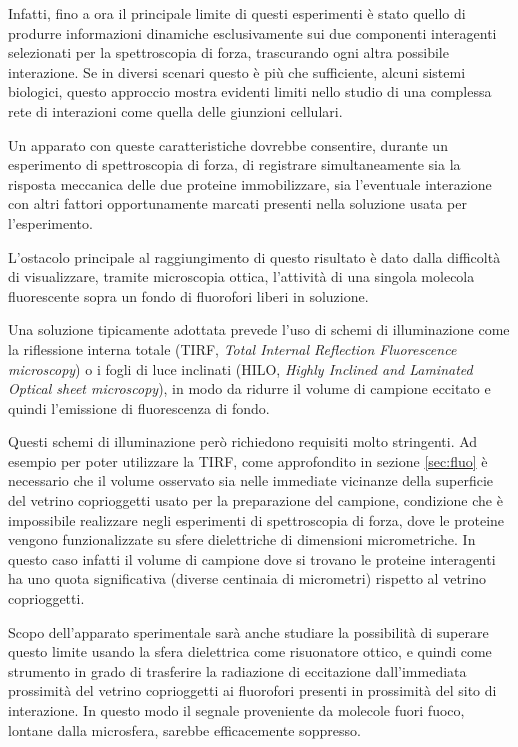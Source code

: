 Infatti, fino a ora il principale limite di questi esperimenti è
stato quello di produrre informazioni dinamiche
esclusivamente sui due componenti interagenti selezionati per la
spettroscopia di forza, trascurando ogni altra possibile interazione.
Se in diversi scenari questo è più che sufficiente, alcuni
sistemi biologici, questo approccio mostra evidenti limiti nello
studio di una complessa rete di interazioni come quella delle
giunzioni cellulari.

Un apparato con queste caratteristiche dovrebbe consentire,
durante un esperimento di spettroscopia di forza, di registrare
simultaneamente sia la risposta meccanica delle due proteine
immobilizzare, sia l'eventuale interazione con altri fattori
opportunamente marcati presenti nella soluzione usata per
l'esperimento.

L'ostacolo principale al raggiungimento di questo risultato è dato
dalla difficoltà di visualizzare, tramite microscopia ottica,
l'attività di una singola molecola fluorescente sopra un fondo di
fluorofori liberi in soluzione.

Una soluzione tipicamente adottata prevede l'uso di schemi di
illuminazione come la riflessione interna totale
(TIRF, \textit{Total Internal Reflection Fluorescence microscopy})
o i fogli di luce inclinati
(HILO, \textit{Highly Inclined and Laminated Optical sheet
microscopy}),
in modo da ridurre il volume di campione eccitato e quindi l'emissione
di fluorescenza di fondo.

Questi schemi di illuminazione però richiedono requisiti molto
stringenti.
Ad esempio per poter utilizzare la TIRF, come approfondito in sezione
\ref{sec:fluo} è necessario che il volume osservato sia nelle
immediate vicinanze della superficie del vetrino
coprioggetti usato per la preparazione del campione,
condizione che è impossibile realizzare negli esperimenti di
spettroscopia di forza, dove le proteine vengono funzionalizzate su
sfere dielettriche di dimensioni micrometriche.
In questo caso infatti il volume di campione
dove si trovano le proteine interagenti ha uno quota significativa
(diverse centinaia di micrometri) rispetto al vetrino coprioggetti.

Scopo dell'apparato sperimentale sarà anche studiare la possibilità di
superare questo limite usando la sfera dielettrica come risuonatore
ottico, e quindi come strumento in grado di trasferire la radiazione
di eccitazione dall'immediata prossimità del vetrino coprioggetti ai
fluorofori presenti in prossimità del sito di interazione.
In questo modo il segnale proveniente da molecole fuori fuoco,
lontane dalla microsfera, sarebbe efficacemente soppresso.

